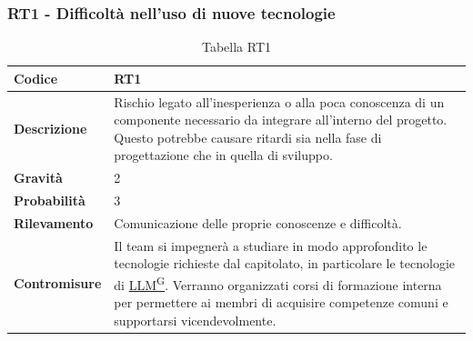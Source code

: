 \documentclass{article}
\begin{document}
    \subsubsection{RT1 - Difficoltà	 nell’uso	di nuove tecnologie}
    \begin{table}[H]
        \renewcommand{\arraystretch}{1.5}
        \centering
        \begin{tabular}{|p{3cm}|p{11cm}|}
            \hline
            \textbf{Codice} & RT1 \\
            \hline
            \textbf{Descrizione} & Rischio legato all’inesperienza o alla poca conoscenza di un componente necessario da integrare all’interno del progetto. Questo potrebbe causare ritardi sia nella fase di progettazione che in quella di sviluppo. \\
            \hline
            \textbf{Gravità} & 2 \\
            \hline
            \textbf{Probabilità} & 3 \\
            \hline
            \textbf{Rilevamento} & Comunicazione delle proprie conoscenze e difficoltà. \\
            \hline
            \textbf{Contromisure} & Il team si impegnerà a studiare in modo approfondito le tecnologie richieste dal capitolato, in particolare le tecnologie di \href{https://code7crusaders.github.io/docs/PB/documentazione_interna/glossario.html#llm-large-language-model}{LLM\textsuperscript{G}}. Verranno organizzati corsi di formazione interna per permettere ai membri di acquisire competenze comuni e supportarsi vicendevolmente. \\
            \hline
        \end{tabular}
        \caption{Tabella RT1}
    \end{table}
\end{document}
